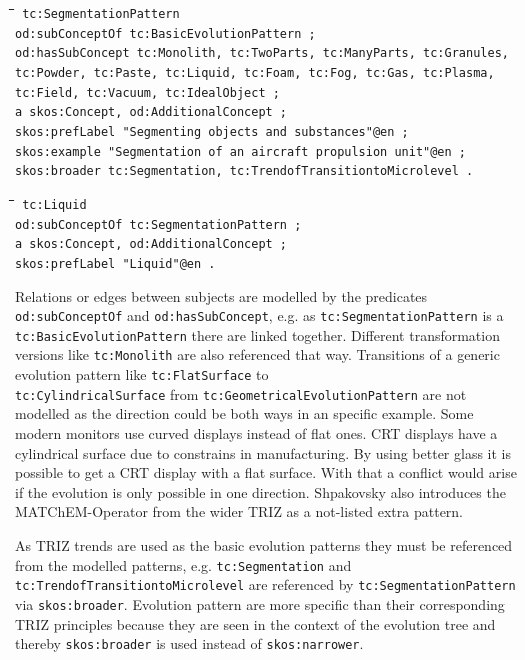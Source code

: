 \documentclass[11pt,a4paper]{article}
\newenvironment{code}{\tt \begin{tabbing}
\hskip12pt\=\hskip12pt\=\hskip12pt\=\hskip12pt\=\hskip5cm\=\hskip5cm\=\kill}
{\end{tabbing}}
\begin{document}
\begin{code}\tt
tc:SegmentationPattern \\
\> od:subConceptOf tc:BasicEvolutionPattern ; \\
\> od:hasSubConcept tc:Monolith, tc:TwoParts, tc:ManyParts, tc:Granules, \\
\> tc:Powder, tc:Paste, tc:Liquid, tc:Foam, tc:Fog, tc:Gas, tc:Plasma, \\
\> tc:Field, tc:Vacuum, tc:IdealObject ; \\
\> a skos:Concept, od:AdditionalConcept ; \\
\> skos:prefLabel "Segmenting objects and substances"@en ; \\
\> skos:example "Segmentation of an aircraft propulsion unit"@en ; \\
\> skos:broader tc:Segmentation, tc:TrendofTransitiontoMicrolevel .
\end{code}
\begin{code}\tt
tc:Liquid \\
\> od:subConceptOf tc:SegmentationPattern ; \\
\> a skos:Concept, od:AdditionalConcept ; \\
\> skos:prefLabel "Liquid"@en . \\
\end{code}

Relations or edges between subjects are modelled by the predicates \texttt{od:subConceptOf} and \texttt{od:hasSubConcept}, e.g. as \texttt{tc:SegmentationPattern} is a \texttt{tc:BasicEvolutionPattern} there are linked together. Different transformation versions like \texttt{tc:Monolith} are also referenced that way. Transitions of a generic evolution pattern like \texttt{tc:FlatSurface} to \\ \texttt{tc:CylindricalSurface} from \texttt{tc:GeometricalEvolutionPattern} are not modelled as the direction could be both ways in an specific example. Some modern monitors use curved displays instead of flat ones. CRT displays have a cylindrical surface due to constrains in manufacturing. By using better glass it is possible to get a CRT display with a flat surface. With that a conflict would arise if the evolution is only possible in one direction. Shpakovsky also introduces the MATChEM-Operator from the wider TRIZ as a not-listed extra pattern.

As TRIZ trends are used as the basic evolution patterns they must be referenced from the modelled patterns, e.g. \texttt{tc:Segmentation} and \texttt{tc:TrendofTransitiontoMicrolevel} are referenced by \texttt{tc:SegmentationPattern} via \texttt{skos:broader}. Evolution pattern are more specific than their corresponding TRIZ principles because they are seen in the context of the evolution tree and thereby \texttt{skos:broader} is used instead of \texttt{skos:narrower}. 
\end{document}
